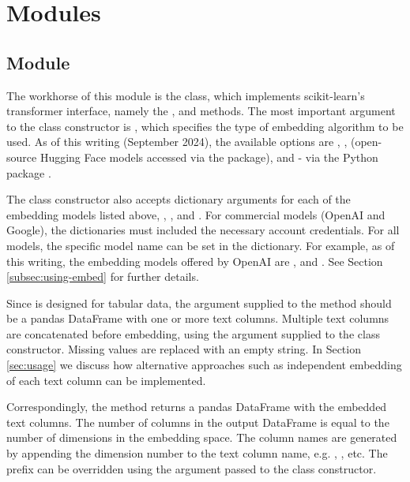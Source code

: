 \documentclass[article]{jss}
\begin{document}
\section[TabuLLM Modules]{ Modules}\label{sec:modules}

\subsection[embed Module]{ Module}\label{subsec:module-embed}

The workhorse of this module is the  class, which implements scikit-learn's transformer interface, namely the ,  and  methods. The most important argument to the class constructor is , which specifies the type of embedding algorithm to be used. As of this writing (September 2024), the available options are , ,  (open-source Hugging Face models accessed via the  package), and  - via the  Python package \citep{rehurek_lrec}. %

The class constructor also accepts dictionary arguments for each of the embedding models listed above, , ,  and . For commercial models (OpenAI and Google), the dictionaries must included the necessary account credentials. For all models, the specific model name can be set in the dictionary. For example, as of this writing, the embedding models offered by OpenAI are ,  and . See Section \ref{subsec:using-embed} for further details.

Since  is designed for tabular data, the  argument supplied to the  method should be a pandas DataFrame with one or more text columns. Multiple text columns are concatenated before embedding, using the  argument supplied to the class constructor. Missing values are replaced with an empty string. In Section \ref{sec:usage} we discuss how alternative approaches such as independent embedding of each text column can be implemented.

Correspondingly, the  method returns a pandas DataFrame with the embedded text columns. The number of columns in the output DataFrame is equal to the number of dimensions in the embedding space. The column names are generated by appending the dimension number to the text column name, e.g. , , etc. The prefix can be overridden using the  argument passed to the class constructor.
\end{document}
